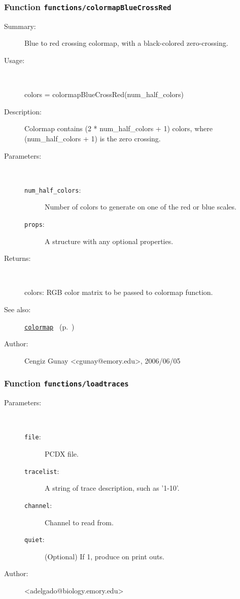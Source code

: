 \subsubsection[Function \texttt{colormapBlueCrossRed}]{Function \texttt{functions/colormapBlueCrossRed}}%
%
\label{ref_functions__colormapBlueCrossRed}%
\hypertarget{ref_functions__colormapBlueCrossRed}{}%
\begin{description}
\item[Summary:]Blue to red crossing colormap, with a black-colored zero-crossing.
%
\item[Usage:]~%
\begin{lyxcode}%
colors = colormapBlueCrossRed(num\_half\_colors)
%
\end{lyxcode}%
%
\item[Description:]%
Colormap contains (2 * num\_half\_colors + 1) colors, where (num\_half\_colors + 1) is the 
 zero crossing.
\item[Parameters:]~
\begin{description}%
\item[\texttt{num\_half\_colors}:]
 Number of colors to generate on one of the red or blue scales.
\item[\texttt{props}:]
 A structure with any optional properties.
\end{description}%
%
\item[Returns:]~

	colors: RGB color matrix to be passed to colormap function.
%
%
\item[See also:]%
\hyperlink{ref_colormap}{\texttt{colormap}}%
\ (p.~\pageref{ref_colormap})%
%
%
\item[Author:]%
Cengiz Gunay <cgunay@emory.edu>, 2006/06/05%
\end{description}
\methodline%
\subsubsection[Function \texttt{loadtraces}]{Function \texttt{functions/loadtraces}}%
%
\label{ref_functions__loadtraces}%
\hypertarget{ref_functions__loadtraces}{}%
\begin{description}
%
%
%
\item[Parameters:]~
\begin{description}%
\item[\texttt{file}:]
 PCDX file.
\item[\texttt{tracelist}:]
 A string of trace description, such as '1-10'.
\item[\texttt{channel}:]
 Channel to read from.
\item[\texttt{quiet}:]
 (Optional) If 1, produce on print outs.
\end{description}%
%
%
%
%
\item[Author:]%
<adelgado@biology.emory.edu>%
\end{description}
\methodline%

